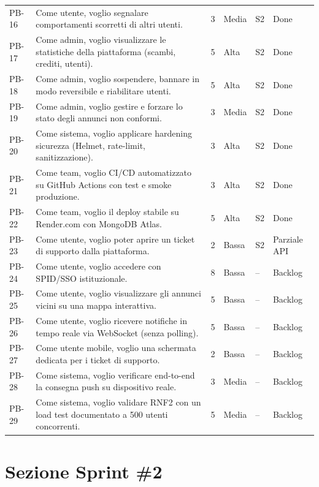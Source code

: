 \documentclass[11pt,a4paper]{article}
\begin{document}
\begin{longtable}{L{0.9cm}L{6.5cm}C{1cm}C{1.3cm}C{1.3cm}L{1.8cm}}
PB-16 & Come utente, voglio segnalare comportamenti scorretti di altri utenti. & 3 & Media & S2 & Done \\
PB-17 & Come admin, voglio visualizzare le statistiche della piattaforma (scambi, crediti, utenti). & 5 & Alta & S2 & Done \\
PB-18 & Come admin, voglio sospendere, bannare in modo reversibile e riabilitare utenti. & 5 & Alta & S2 & Done \\
PB-19 & Come admin, voglio gestire e forzare lo stato degli annunci non conformi. & 3 & Media & S2 & Done \\
PB-20 & Come sistema, voglio applicare hardening sicurezza (Helmet, rate-limit, sanitizzazione). & 3 & Alta & S2 & Done \\
PB-21 & Come team, voglio CI/CD automatizzato su GitHub Actions con test e smoke produzione. & 3 & Alta & S2 & Done \\
PB-22 & Come team, voglio il deploy stabile su Render.com con MongoDB Atlas. & 5 & Alta & S2 & Done \\
PB-23 & Come utente, voglio poter aprire un ticket di supporto dalla piattaforma. & 2 & Bassa & S2 & Parziale API \\
PB-24 & Come utente, voglio accedere con SPID/SSO istituzionale. & 8 & Bassa & -- & Backlog \\
PB-25 & Come utente, voglio visualizzare gli annunci vicini su una mappa interattiva. & 5 & Bassa & -- & Backlog \\
PB-26 & Come utente, voglio ricevere notifiche in tempo reale via WebSocket (senza polling). & 5 & Bassa & -- & Backlog \\
PB-27 & Come utente mobile, voglio una schermata dedicata per i ticket di supporto. & 2 & Bassa & -- & Backlog \\
PB-28 & Come sistema, voglio verificare end-to-end la consegna push su dispositivo reale. & 3 & Media & -- & Backlog \\
PB-29 & Come sistema, voglio validare RNF2 con un load test documentato a 500 utenti concorrenti. & 5 & Media & -- & Backlog \\

\end{longtable}

\section{Sezione Sprint \#2}
\end{document}
